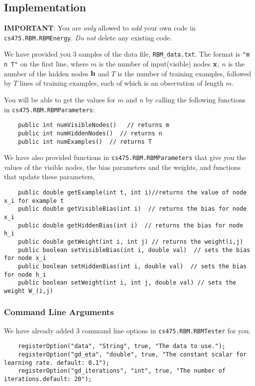 \documentclass[11pt]{article}
\newcommand{\vx}{{\bf x}}
\newcommand{\vh}{{\bf h}}
\newcommand{\code}[1]{{\footnotesize \tt #1}}
\begin{document}
\subsection{Implementation} %
\textbf{IMPORTANT}: You are {\em only} allowed to {\em add} your own code in \code{cs475.RBM.RBMEnergy}. {\em Do not} delete any existing code.

We have provided you 3 samples of the data file, \code{RBM\_data.txt}. The format is \code{"m n T"} on the first line, where $m$ is the number of  input(visible) nodes $\vx$, $n$ is the number of the hidden nodes $\vh$ and $T$ is the number of training examples, followed by $T$ lines of training examples, each of which is an observation of length $m$.

You will be able to get the values for $m$ and $n$ by calling the following functions in \code{cs475.RBM.RBMParameters}:
\begin{footnotesize}
\begin{verbatim}
    public int numVisibleNodes()   // returns m
    public int numHiddenNodes()  // returns n
    public int numExamples()  // returns T
\end{verbatim}
\end{footnotesize}
We have also provided functions in \code{cs475.RBM.RBMParameters} that give you the values of the visible nodes, the bias parameters and the weights, and functions that update these parameters,
\begin{footnotesize}
\begin{verbatim}
    public double getExample(int t, int i)//returns the value of node x_i for example t
    public double getVisibleBias(int i)  // returns the bias for node x_i
    public double getHiddenBias(int i)  // returns the bias for node h_i
    public double getWeight(int i, int j) // returns the weight(i,j)
    public boolean setVisibleBias(int i, double val)  // sets the bias for node x_i
    public boolean setHiddenBias(int i, double val)  // sets the bias for node h_i
    public boolean setWeight(int i, int j, double val) // sets the weight W_(i,j)
\end{verbatim}
\end{footnotesize}

\subsubsection{Command Line Arguments}
We have already added 3 command line options in \code{cs475.RBM.RBMTester} for you.
\begin{footnotesize}
\begin{verbatim}
    registerOption("data", "String", true, "The data to use.");
    registerOption("gd_eta", "double", true, "The constant scalar for learning rate. default: 0.1");
    registerOption("gd_iterations", "int", true, "The number of iterations.default: 20");
\end{verbatim}
\end{footnotesize}
\end{document}
